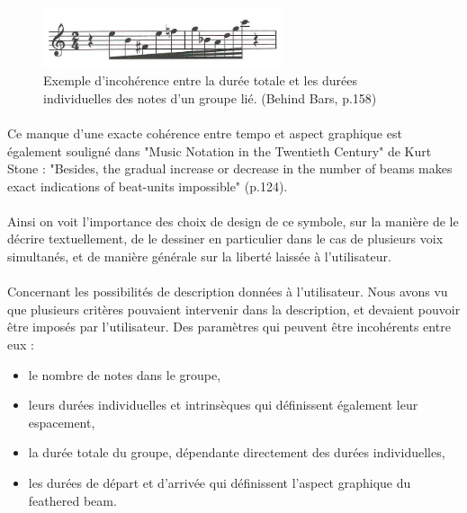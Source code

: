 \documentclass[a4paper,10pt,twocolumn]{article}
\begin{document}
\begin{figure}[h]
\centering
\includegraphics[width=7cm]{img/behindbars.jpg}
\caption{Exemple d'incohérence entre la durée totale et les durées individuelles des notes d'un groupe lié. (Behind Bars, p.158) }
\label{fig:incoherence}
\end{figure}

\paragraph{}
Ce manque d'une exacte cohérence entre tempo et aspect graphique est également souligné dans "Music Notation in the Twentieth Century" de Kurt Stone \cite{ref3} : "Besides, the gradual increase or decrease in the number of beams makes exact indications of beat-units impossible" (p.124).

\paragraph{}
Ainsi on voit l'importance des choix de design de ce symbole, sur la manière de le décrire textuellement, de le dessiner en particulier dans le cas de plusieurs voix simultanés, et de manière générale sur la liberté laissée à l'utilisateur.
\\

\paragraph{}
Concernant les possibilités de description données à l'utilisateur. Nous avons vu que plusieurs critères pouvaient intervenir dans la description, et devaient pouvoir être imposés par l'utilisateur. Des paramètres qui peuvent être incohérents entre eux :
\begin{itemize}
\item le nombre de notes dans le groupe,
\item leurs durées individuelles et intrinsèques qui définissent également leur espacement,
\item la durée totale du groupe, dépendante directement des durées individuelles,
\item les durées de départ et d'arrivée qui définissent l'aspect graphique du feathered beam.
\end{itemize}
\end{document}
